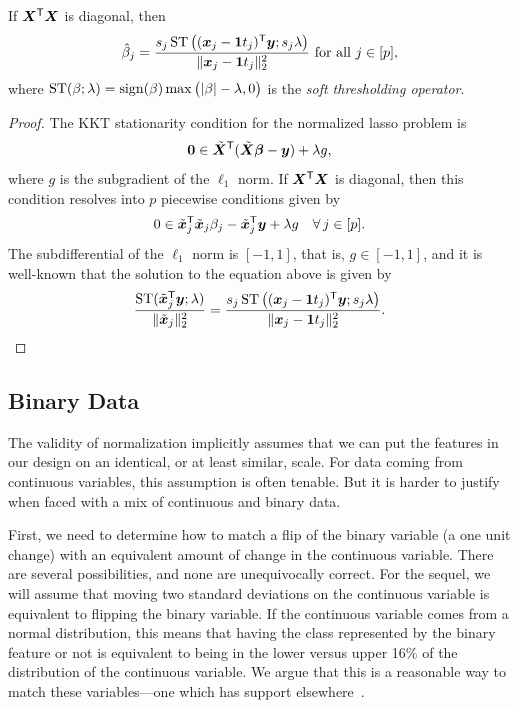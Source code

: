 \begin{proposition}
  If \(\mat X^\T \mat X\) is diagonal, then
  \[
    \hat{\beta}_j = \frac{s_j\softthreshold\big((\vec x_j - \vec{1}t_j)^\T\vec{y}; s_j\lambda\big)}{\lVert \vec x_j - \vec{1}t_j\rVert_2^2} \text{ for all } j \in [p],
  \]
  where \(\operatorname{ST}(\beta; \lambda) = \operatorname{sign}(\beta)\max\big(\lvert \beta \rvert - \lambda, 0\big)\) is the \emph{soft thresholding operator}.
\end{proposition}
\begin{proof}
  The KKT stationarity condition for the normalized lasso problem is
  \[
    \vec{0} \in \tilde{\mat{X}}^\T(\tilde{\mat{X}}\vec{\beta} - \vec{y}) + \lambda g,
  \]
  where \(g\) is the subgradient of the \(\ell_1\) norm.
  If \(\mat{X}^\T\mat{X}\) is diagonal, then this condition resolves into \(p\) piecewise conditions given by
  \[
    0 \in \tilde{\vec{x}}_j^\T\tilde{\vec{x}}_j\beta_j - \tilde{\vec{x}}_j^\T\vec{y} + \lambda g \quad \forall\, j \in [p].
  \]
  The subdifferential of the \(\ell_1\) norm is \([-1, 1]\), that is, \(g \in [-1, 1]\), and it is well-known that the solution to the equation above is
  given by
  \[
    \frac{\softthreshold(\tilde{\vec{x}}_j^\T \vec{y}; \lambda)}{\lVert \tilde{\vec{x}}_j\rVert_2^2} =
    \frac{s_j\softthreshold\big((\vec{x}_j - \vec{1}t_j)^\T\vec{y}; s_j\lambda\big)}{\lVert \vec{x}_j - \vec{1}t_j\rVert_2^2}.
  \]
\end{proof}

\subsection{Binary Data}

The validity of normalization implicitly assumes that we can put the features in our design on an identical, or at least similar, scale. For data coming from continuous variables, this assumption is often tenable. But it is harder to justify when faced with a mix of continuous and binary data.

First, we need to determine how to match a flip of the binary variable (a one unit change) with an equivalent amount of change in the continuous variable. There are several possibilities, and none are unequivocally correct. For the sequel, we will assume that moving two standard deviations on the continuous variable is equivalent to flipping the binary variable. If the continuous variable comes from a normal distribution, this means that having the class represented by the binary feature or not is equivalent to being in the lower versus upper 16\% of the distribution of the continuous variable. We argue that this is a reasonable way to match these variables---one which has support elsewhere~\parencite{gelman2008}.

